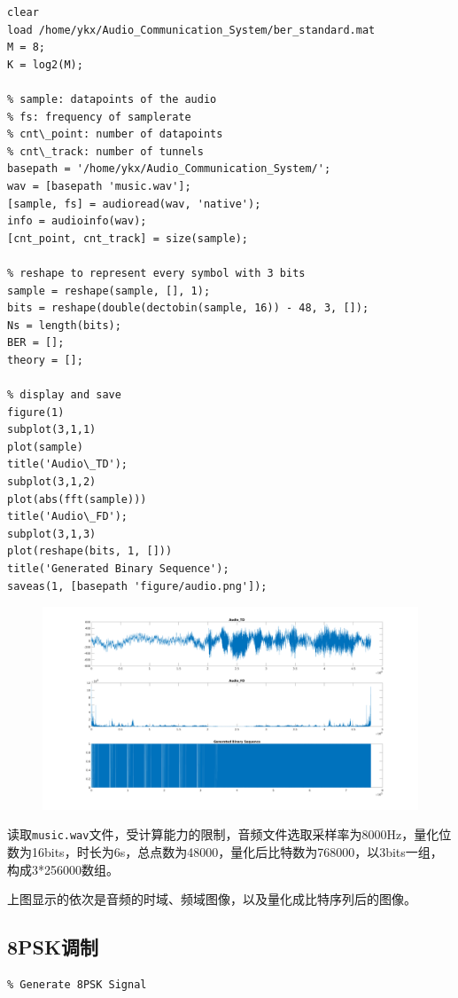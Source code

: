 \begin{spacing}{1.5}
\begin{lstlisting}
clear
load /home/ykx/Audio_Communication_System/ber_standard.mat
M = 8;
K = log2(M);

% sample: datapoints of the audio
% fs: frequency of samplerate
% cnt\_point: number of datapoints
% cnt\_track: number of tunnels
basepath = '/home/ykx/Audio_Communication_System/';
wav = [basepath 'music.wav'];
[sample, fs] = audioread(wav, 'native');
info = audioinfo(wav);
[cnt_point, cnt_track] = size(sample);

% reshape to represent every symbol with 3 bits
sample = reshape(sample, [], 1);
bits = reshape(double(dectobin(sample, 16)) - 48, 3, []);
Ns = length(bits);
BER = [];   
theory = [];

% display and save
figure(1)
subplot(3,1,1)
plot(sample)
title('Audio\_TD');
subplot(3,1,2)
plot(abs(fft(sample)))
title('Audio\_FD');
subplot(3,1,3)
plot(reshape(bits, 1, []))
title('Generated Binary Sequence');
saveas(1, [basepath 'figure/audio.png']);
\end{lstlisting}

\begin{figure}[H]
\centering{}
\includegraphics[width = 1\columnwidth]{audio.png}
\end{figure}

读取\verb|music.wav|文件，受计算能力的限制，音频文件选取采样率为8000Hz，量化位数为16bits，时长为6s，总点数为48000，量化后比特数为768000，以3bits一组，构成3*256000数组。

上图显示的依次是音频的时域、频域图像，以及量化成比特序列后的图像。

\subsection{8PSK调制}

\begin{lstlisting}
% Generate 8PSK Signal


\end{lstlisting}
\end{spacing}
